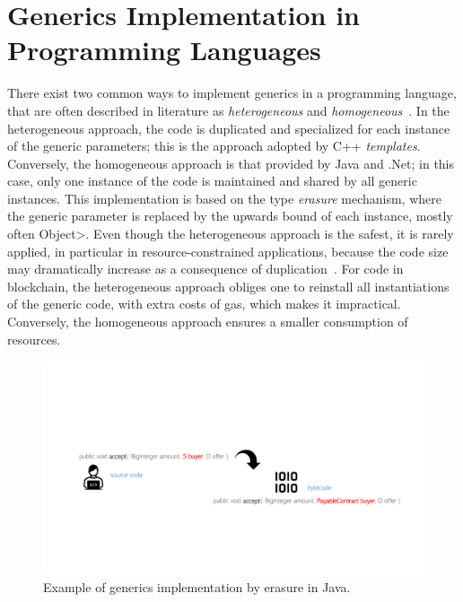 \section{Generics Implementation in Programming Languages}\label{sec:java_generics}

There exist two common ways to implement generics in a programming language,
that are often described in literature as \emph{heterogeneous}
and \emph{homogeneous}~\cite{generics_categories}.
In the heterogeneous approach, the code is duplicated and specialized for each instance
of the generic parameters; this is the approach adopted by C++ \emph{templates}.
Conversely, the homogeneous approach is that provided by Java and .Net; in this case,
only one instance of the code is maintained and shared by all generic instances.
This implementation is based on the type \emph{erasure} mechanism, where the generic parameter
is replaced by the upwards bound of each instance, mostly often \<Object>.
Even though the heterogeneous approach is the safest, it is rarely applied, in particular
in resource-constrained applications, because the code size may dramatically increase
as a consequence of duplication~\cite{generics_embedded_systems}. For code in blockchain,
the heterogeneous approach obliges one to reinstall all instantiations of the generic code,
with extra costs of gas, which makes it impractical.
Conversely, the homogeneous approach ensures a smaller consumption of resources.

\begin{figure}[ht]
\centering
\includegraphics[width=0.8\linewidth]{figures/java_generics_erasure}
\caption{Example of generics implementation by erasure in Java.}
\label{figure.java_generics_erasure}
\end{figure}

